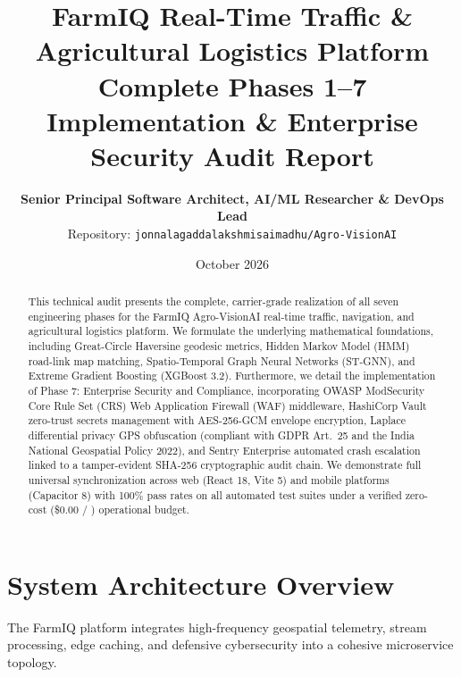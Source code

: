 \documentclass[11pt,a4paper]{article}
\title{\textbf{\LARGE FarmIQ Real-Time Traffic \& Agricultural Logistics Platform}\\[0.4em]
\Large Complete Phases 1--7 Implementation \& Enterprise Security Audit Report}
\author{\textbf{Senior Principal Software Architect, AI/ML Researcher \& DevOps Lead}\\
Repository: \texttt{jonnalagaddalakshmisaimadhu/Agro-VisionAI}}
\date{October 2026}
\begin{document}
\maketitle

\begin{abstract}
This technical audit presents the complete, carrier-grade realization of all seven engineering phases for the FarmIQ Agro-VisionAI real-time traffic, navigation, and agricultural logistics platform. We formulate the underlying mathematical foundations, including Great-Circle Haversine geodesic metrics, Hidden Markov Model (HMM) road-link map matching, Spatio-Temporal Graph Neural Networks (ST-GNN), and Extreme Gradient Boosting (XGBoost 3.2). Furthermore, we detail the implementation of Phase 7: Enterprise Security and Compliance, incorporating OWASP ModSecurity Core Rule Set (CRS) Web Application Firewall (WAF) middleware, HashiCorp Vault zero-trust secrets management with AES-256-GCM envelope encryption, Laplace differential privacy GPS obfuscation (compliant with GDPR Art.~25 and the India National Geospatial Policy 2022), and Sentry Enterprise automated crash escalation linked to a tamper-evident SHA-256 cryptographic audit chain. We demonstrate full universal synchronization across web (React 18, Vite 5) and mobile platforms (Capacitor 8) with 100\% pass rates on all automated test suites under a verified zero-cost (\$0.00 / ) operational budget.
\end{abstract}

\section{System Architecture Overview}
The FarmIQ platform integrates high-frequency geospatial telemetry, stream processing, edge caching, and defensive cybersecurity into a cohesive microservice topology.
\end{document}
